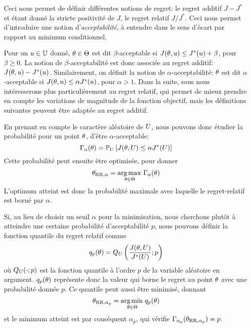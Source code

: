 \documentclass[../../Main_ManuscritThese.tex]{subfiles}
\begin{document}
Ceci nous permet de définir différentes notions de regret: le regret
additif $J - J^*$ et étant donné la stricte positivité de $J$, le
regret relatif $J/J^*$. Ceci nous permet d'introduire une notion
d'\emph{acceptabilité}, à entendre dans le sens d'écart par rapport au
minimum conditionnel.

Pour un $u\in\mathbb{U}$ donné, $\theta\in\Theta$ est dit
$\beta$-acceptable si $J(\theta, u) \leq J^*(u) + \beta$, pour
$\beta \geq 0$. La notion de $\beta$-acceptabilité est donc associée
au regret additif: $J(\theta, u) - J^*(u)$.  Similairement, on
définit la notion de $\alpha$-acceptabilité: $\theta$ est dit
$\alpha$-acceptable si $J(\theta, u) \leq \alpha J^*(u)$, pour
$\alpha > 1$. Dans la suite, sous nous intéresserons plus
particulièrement au regret relatif, qui permet de mieux prendre en
compte les variations de magnitude de la fonction objectif, mais les
définitions suivantes peuvent être adaptée au regret additif.


En prenant en compte le caractère aléatoire de $U$, nous pouvons
donc étudier la probabilité pour un point $\theta$, d'être $\alpha$-acceptable:
\begin{equation*}
\Gamma_{\alpha}(\theta) = \mathbb{P}_{U}\left[J(\theta,U) \leq \alpha J^*(U) \right]
\end{equation*}
Cette probabilité peut ensuite être optimisée, pour donner
\begin{equation*}
  \theta_{\mathrm{RR},\alpha} = \operatorname*{arg\,max \,}_{\theta \in\Theta} \Gamma_\alpha(\theta)
\end{equation*}
L'optimum atteint est donc la probabilité maximale avec laquelle le
regret-relatif est borné par $\alpha$.


Si, au lieu de choisir un seuil $\alpha$ pour la minimisation, nous
cherchons plutôt à atteindre une certaine probabilité d'acceptabilité
$p$, nous pouvons définir la fonction quantile du regret relatif comme
\begin{equation*}
  q_p(\theta) = Q_{U}\left(\frac{J(\theta,U)}{J^*(U)};p\right)
\end{equation*}
où $Q_{U}(\cdot;p)$ est la fonction quantile à l'ordre $p$ de la
variable aléatoire en argument. $q_p(\theta)$ représente donc la valeur qui
borne le regret au point $\theta$ avec une probabilité donnée $p$.
Ce quantile peut aussi être minimisé, donnant
\begin{equation*}
  \theta_{\mathrm{RR},\alpha_p} = \operatorname*{arg\,min \,}_{\theta \in \Theta} q_p(\theta)
\end{equation*}
et le minimum atteint est par conséquent $\alpha_p$, qui vérifie
$\Gamma_{\alpha_p}(\theta_{\mathrm{RR},\alpha_p}) = p$.
  
\end{document}
